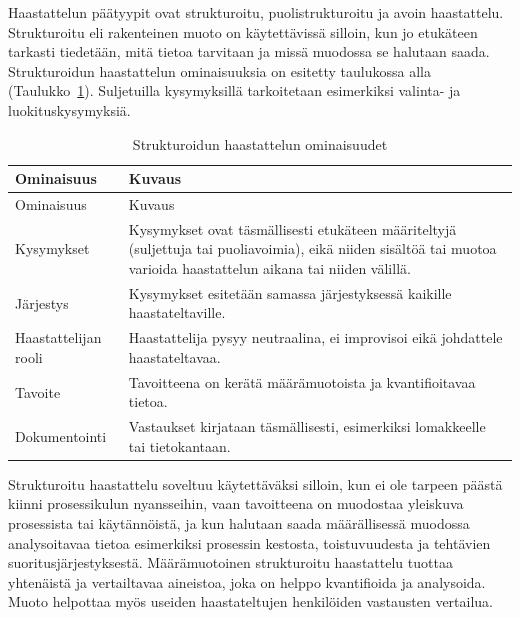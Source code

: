 \documentclass[
  finnish,
  letterpaper,
  DIV=11,
  numbers=noendperiod,
  oneside]{scrreprt}
\begin{document}
Haastattelun päätyypit ovat strukturoitu, puolistrukturoitu ja avoin
haastattelu. Strukturoitu eli rakenteinen muoto on käytettävissä
silloin, kun jo etukäteen tarkasti tiedetään, mitä tietoa tarvitaan ja
missä muodossa se halutaan saada. Strukturoidun haastattelun
ominaisuuksia on esitetty taulukossa alla
(Taulukko~\ref{tbl-strukturoitu-haastattelu}). Suljetuilla kysymyksillä
tarkoitetaan esimerkiksi valinta- ja luokituskysymyksiä.

\begin{longtable}[]{@{}
  >{\raggedright\arraybackslash}p{}
  >{\raggedright\arraybackslash}p{}@{}}
\caption{Strukturoidun haastattelun
ominaisuudet}\label{tbl-strukturoitu-haastattelu}\tabularnewline
\toprule\noalign{}
\begin{minipage}[b]{\linewidth}\raggedright
Ominaisuus
\end{minipage} & \begin{minipage}[b]{\linewidth}\raggedright
Kuvaus
\end{minipage} \\
\midrule\noalign{}
\endfirsthead
\toprule\noalign{}
\begin{minipage}[b]{\linewidth}\raggedright
Ominaisuus
\end{minipage} & \begin{minipage}[b]{\linewidth}\raggedright
Kuvaus
\end{minipage} \\
\midrule\noalign{}
\endhead
\bottomrule\noalign{}
\endlastfoot
Kysymykset & Kysymykset ovat täsmällisesti etukäteen määriteltyjä
(suljettuja tai puoliavoimia), eikä niiden sisältöä tai muotoa varioida
haastattelun aikana tai niiden välillä. \\
Järjestys & Kysymykset esitetään samassa järjestyksessä kaikille
haastateltaville. \\
Haastattelijan rooli & Haastattelija pysyy neutraalina, ei improvisoi
eikä johdattele haastateltavaa. \\
Tavoite & Tavoitteena on kerätä määrämuotoista ja kvantifioitavaa
tietoa. \\
Dokumentointi & Vastaukset kirjataan täsmällisesti, esimerkiksi
lomakkeelle tai tietokantaan. \\
\end{longtable}

Strukturoitu haastattelu soveltuu käytettäväksi silloin, kun ei ole
tarpeen päästä kiinni prosessikulun nyansseihin, vaan tavoitteena on
muodostaa yleiskuva prosessista tai käytännöistä, ja kun halutaan saada
määrällisessä muodossa analysoitavaa tietoa esimerkiksi prosessin
kestosta, toistuvuudesta ja tehtävien suoritusjärjestyksestä.
Määrämuotoinen strukturoitu haastattelu tuottaa yhtenäistä ja
vertailtavaa aineistoa, joka on helppo kvantifioida ja analysoida. Muoto
helpottaa myös useiden haastateltujen henkilöiden vastausten vertailua.
\end{document}

